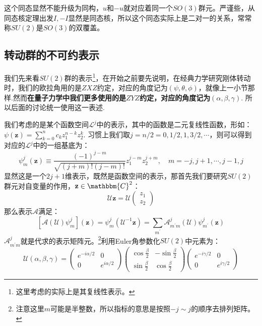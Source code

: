 这个同态显然不能升级为同构，$u$和$-u$就对应着同一个$SO(3)$群元。严谨些，从同态核定理出发${I,-I}$显然是同态核，所以这个同态实际上是二对一的关系，常常称$SU(2)$是$SO(3)$的双覆盖。

\subsection{转动群的不可约表示}
我们先来看$SU(2)$群的表示\footnote{这里考虑的实际上是其复线性表示。}，在开始之前要先说明，在经典力学研究刚体转动时，我们的欧拉角用的是$ZXZ$约定，对应的角度记为$(\psi,\theta,\phi)$，就像上一小节那样.然而\textbf{在量子力学中我们更多使用的是$ZYZ$约定，对应的角度记为$(\alpha,\beta,\gamma)$}. 所以后面的讨论统一使用这一表述.

我们考虑的是某个函数空间$\mathscr{L}^j$中的表示，其中的函数是二元复线性函数，形如：$\psi(\mathbf{z})=\sum_{k=0}^n c_kz_1^{n-k}z_2^k$. 习惯上我们取$j=n/2=0,1/2,1,3/2,\cdots$，则可以得到对应的$\mathscr{L}^j$中的一组基底为：
\begin{equation}
	\psi_m^j(\mathbf{z})\equiv\frac{(-1)^{j-m}}{\sqrt{(j+m)!(j-m)!}}z_1^{j-m}z_2^{j+m},\quad m=-j,j+1,\cdots,j-1,j
\end{equation}
显然这是一个$2j+1$维表示，既然是函数空间的表示，那首先我们要研究$SU(2)$群元对自变量的作用，$\mathbf{z}\in \mathbbm{C}^2$：
\[\mathcal{U}\mathbf{z}=\mathcal{U}\begin{pmatrix}
	z_1 \\
	z_2
\end{pmatrix}\]
那么表示$\mathscr{A}$满足：
\[\left[\mathscr{A}(\mathcal{U})\psi_m^j\right](\mathbf{z})=\psi_m^j(\mathcal{U}^{-1}\mathbf{z})=\sum_{m^\prime}\mathcal{A}^j_{m^\prime m}(\mathcal{U})\psi_{m^\prime}^j(\mathbf{z})\]
$\mathcal{A}^j_{m^\prime m}$就是代求的表示矩阵元。\footnote{注意这里$m$可能是半整数，所以指标的意思是按照$-j\sim j$的顺序去排列矩阵。}利用Euler角参数化$SU(2)$中元素为：
\begin{equation}
	\mathcal{U}(\alpha,\beta,\gamma)=\left( {\begin{array}{*{20}{c}}
			{{e^{ - i\alpha /2}}}&0 \\ 
			0&{{e^{i\alpha /2}}} 
	\end{array}} \right)\left( {\begin{array}{*{20}{c}}
			{\cos \frac{\beta }{2}}&{ - \sin \frac{\beta }{2}} \\ 
			{\sin \frac{\beta }{2}}&{\cos \frac{\beta }{2}} 
	\end{array}} \right)\left( {\begin{array}{*{20}{c}}
	{{e^{ - i\gamma /2}}}&0 \\ 
	0&{{e^{i\gamma /2}}} 
\end{array}} \right)
\end{equation}

